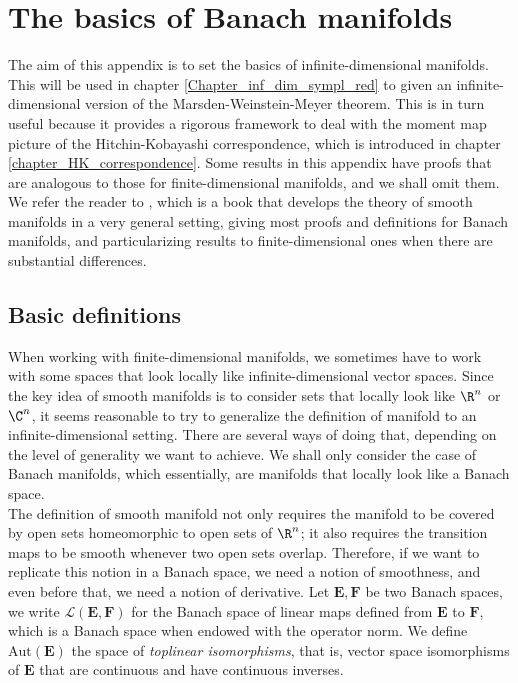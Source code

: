 \chapter{The basics of Banach manifolds}\label{appendix_Banach_manifolds}

The aim of this appendix is to set the basics of infinite-dimensional manifolds. This will be used in chapter \ref{Chapter_inf_dim_sympl_red} to given an infinite-dimensional version of the Marsden-Weinstein-Meyer theorem. This is in turn useful because it provides a rigorous framework to deal with the moment map picture of the Hitchin-Kobayashi correspondence, which is introduced in chapter \ref{chapter_HK_correspondence}. Some results in this appendix have proofs that are analogous to those for finite-dimensional manifolds, and we shall omit them. We refer the reader to \parencite{SergeLang}, which is a book that develops the theory of smooth manifolds in a very general setting, giving most proofs and definitions for Banach manifolds, and particularizing results to finite-dimensional ones when there are substantial differences.

\section{Basic definitions}
When working with finite-dimensional manifolds, we sometimes have to work with some spaces that look locally like infinite-dimensional vector spaces. Since the key idea of smooth manifolds is to consider sets that locally look like \(\R^n\) or \(\C^n\), it seems reasonable to try to generalize the definition of manifold to an infinite-dimensional setting. There are several ways of doing that, depending on the level of generality we want to achieve. We shall only consider the case of Banach manifolds, which essentially, are manifolds that locally look like a Banach space. \\

The definition of smooth manifold not only requires the manifold to be covered by open sets homeomorphic to open sets of \(\R^n\); it also requires the transition maps to be smooth whenever two open sets overlap. Therefore, if we want to replicate this notion in a Banach space, we need a notion of smoothness, and even before that, we need a notion of derivative. Let \(\mathbf{E},\mathbf{F}\) be two Banach spaces, we write \(\mathcal{L}(\mathbf{E},\mathbf{F})\) for the Banach space of linear maps defined from \(\mathbf{E}\) to \(\mathbf{F}\), which is a Banach space when endowed with the operator norm. We define \(\mathrm{Aut}(\mathbf{E})\) the space of \textit{toplinear isomorphisms}, that is, vector space isomorphisms of \(\mathbf{E}\) that are continuous and have continuous inverses.

